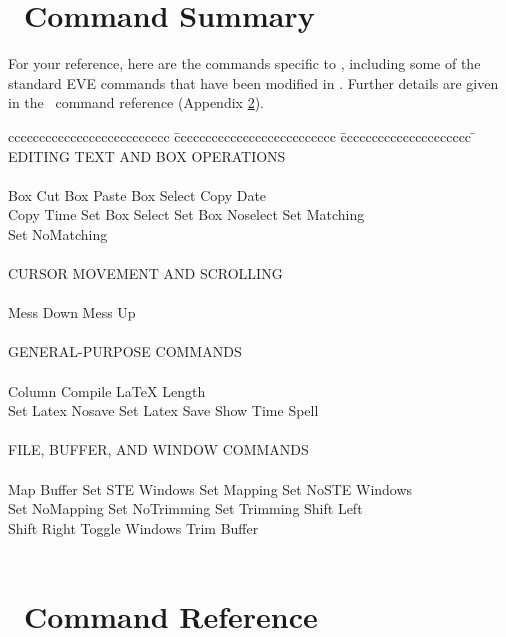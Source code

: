 \appendix

\section{\STEve\ Command Summary}

For your reference, here are the commands specific to \STEve,
including some of the standard EVE commands that have been modified in \STEve.
Further details are given in the \STEve\ command reference (Appendix
\ref{command_reference}).

\begin{tabbing}
cccccccccccccccccccccccccc \= cccccccccccccccccccccccccc \= ccccccccccccccccccccc \= \kill
 EDITING TEXT AND BOX OPERATIONS \\
 \\
    Box Cut       \>    Box Paste   \>   Box Select      \> Copy Date        \\
    Copy Time     \>    Set Box Select  \> Set Box Noselect \> Set Matching \\
    Set NoMatching \\
 \\
 CURSOR MOVEMENT AND SCROLLING \\
 \\
    Mess Down    \>     Mess Up  \\
 \\
 GENERAL-PURPOSE COMMANDS \\
 \\
    Column           \> Compile        \> LaTeX        \>   Length  \\
    Set Latex Nosave \> Set Latex Save \> Show Time    \>   Spell   \\
 \\
 FILE, BUFFER, AND WINDOW COMMANDS \\
 \\
    Map Buffer     \>  Set STE Windows \> Set Mapping  \>   Set NoSTE Windows \\
    Set NoMapping  \>  Set NoTrimming  \> Set Trimming \>   Shift Left  \\
    Shift Right    \>  Toggle Windows  \> Trim Buffer   \\
 \\
\end{tabbing}

\newpage

\section{\STEve\ Command Reference}
\label{command_reference}

